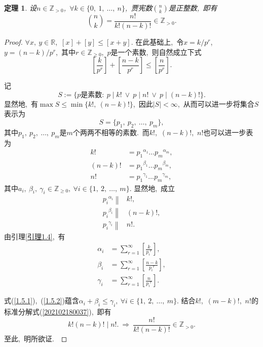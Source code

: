 \documentclass[UTF8, twoside]{ctexart}
\theoremstyle{nonumberplain}
\newtheorem{proof}{\heiti 证明}  %
\theoremstyle{nonumberplain}
\theoremstyle{plain}
\newtheorem{dingli}[dingyi]{定理}
\begin{document}
	\begin{dingli} \label{贾宪数是整数}
		设$n \in \mathbb{Z}_{>0}$,\ $\forall k \in \{0,\ 1,\ \dots,\ n\}$,\ 贾宪数$\binom{n}{k}$是正整数,\ 即有
		\[
			\binom{n}{k} = \frac{n!}{k! \left( n-k \right)!} \in \mathbb{Z}_{>0}.
		\]
	\end{dingli}
		\begin{proof}
			$\forall x,\ y \in \mathbb{R}$,\ 
			$\left[ x \right] + \left[ y \right] \le \left[ x+y \right]$. 
			在此基础上,\ 令$x = k / p^r$,\ $y = \left( n-k \right) / p^r$,\ 其中$r \in \mathbb{Z}_{\ge 0}$,\ 
			$p$是一个素数,\ 则自然成立下式
			\begin{equation} \label{1.5.1}
				\left[ \frac{k}{p^r} \right] + \left[ \frac{n-k}{p^r} \right] \le 
				\left[ \frac{n}{p^r} \right].
			\end{equation}
			
			记
			\[
			S:=\{p\text{是素数}:\ p \mid k!\ \vee\ p \mid n!\ \vee\ p \mid \left( n-k \right)!\}.
			\]
			显然地,\ 有$\max S \le \min \{k!,\ \left( n-k \right)!\}$,\ 因此$\left| S \right| < \infty$,\ 
			从而可以进一步将集合$S$表示为
			\[
				S = \{p_1,\ p_2,\ \dots,\ p_m\},
			\]
			其中$p_1,\ p_2,\ \dots,\ p_m$是$m$个两两不相等的素数.\ 而$k!$,\ $\left( n-k \right)!$,\ $n!$也可以进一步表为
			\begin{align*}
				k! &= {p_1}^{\alpha_1}\dots {p_m}^{\alpha_m}, \\
				\left( n-k \right)! &= {p_1}^{\beta_1}\dots {p_m}^{\beta_m}, \\
				n! &= {p_1}^{\gamma_1}\dots {p_m}^{\gamma_m},
			\end{align*}
			其中$a_i,\ \beta_i,\ \gamma_i \in \mathbb{Z}_{\ge 0},\ \forall i \in \{1,\ 2,\ \dots,\ m\}$. 
			显然地,\ 成立
			\begin{subequations} \label{202102180037}
				\begin{align} 
				\left. {p_i}^{\alpha_i} \right\| & k!, \\
				\left. {p_i}^{\beta_i} \right\| & \left( n-k \right)!, \\
				\left. {p_i}^{\gamma_i} \right\| & n!.
				\end{align}
			\end{subequations}
			由引理\ref{引理1.4},\ 有
			\begin{subequations} \label{1.5.2}
				\begin{align}
					\alpha_i &= \sum_{r=1}^{\infty} \left[ \frac{k}{{p_i}^r} \right], \\
					\beta_i &= \sum_{r=1}^{\infty} \left[ \frac{n-k}{{p_i}^r} \right], \\
					\gamma_i &= \sum_{r=1}^{\infty} \left[ \frac{n}{{p_i}^r} \right].
				\end{align}
			\end{subequations}
			
			式(\ref{1.5.1}),\ (\ref{1.5.2})蕴含$\alpha_i + \beta_i \le \gamma_i,\ \forall i \in \{1,\ 2,\ \dots,\ m\}$. 
			结合$k!$,\ $\left( m-k \right)!$,\ $n!$的标准分解式(\ref{202102180037}),\ 即有
			\[
				k! \left( n-k \right)! \mid n!. \ \Longrightarrow \  \frac{n!}{k! \left( n-k \right)!} \in \mathbb{Z}_{>0}.
			\]
			至此,\ 明所欲证.\ 
		\end{proof}
	
\end{document}
